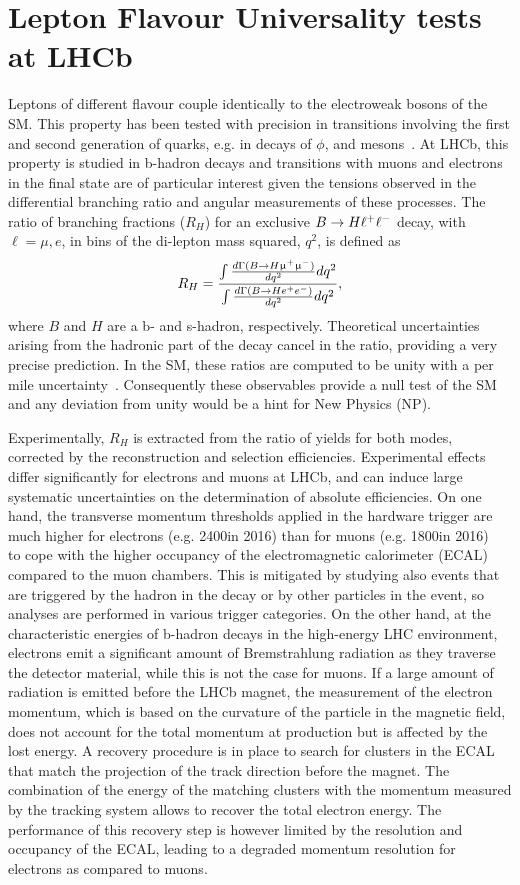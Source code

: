 \documentclass[a4paper,11pt]{article}
\begin{document}
\section{Lepton Flavour Universality tests at LHCb}
Leptons of different flavour couple identically to the electroweak bosons of the SM. 
This property has been tested with precision in transitions involving the first and second generation of quarks, e.g. in decays of $\phi$, \jpsi and \psitwos mesons~\cite{PDG}.
At LHCb, this property is studied in b-hadron decays and \bsll transitions with muons and electrons in the final state are of particular interest given the tensions observed in the differential branching ratio and angular measurements of these processes.
The ratio of branching fractions ($R_H$) for an exclusive $B \to H {\ell^+}{\ell^-}$ decay, with $\ell=\mu, e$, in bins of the di-lepton mass squared, $q^2$, is defined as
\begin{equation}
	R_H = \frac{\int \frac{d\Gamma(B \to H {\upmu^+}{\upmu^-})}{dq^2}dq^2}{\int \frac{d\Gamma(B \to H e^+e^-)}{dq^2}dq^2},
\end{equation}
where $B$ and $H$ are a b- and s-hadron, respectively.
Theoretical uncertainties arising from the hadronic part of the decay cancel in the ratio, providing a very precise prediction.
In the SM, these ratios are computed to be unity with a per mile uncertainty~\cite{Fuentes}. 
Consequently these observables provide a null test of the SM and any deviation from unity would be a hint for New Physics (NP).

Experimentally, $R_H$ is extracted from the ratio of yields for both modes, corrected by the reconstruction and selection efficiencies.
Experimental effects differ significantly for electrons and muons at LHCb, and can induce large systematic uncertainties on the determination of absolute efficiencies. 
On one hand, the transverse momentum thresholds applied in the hardware trigger are much higher for electrons (e.g. 2400\mev in 2016) 
than for muons (e.g. 1800\mev in 2016)~\cite{trigger} to cope with the higher occupancy of the electromagnetic calorimeter (ECAL) compared to the muon chambers. 
This is mitigated by studying also events that are triggered by the hadron in the decay or by other particles in the event, so analyses are performed in various trigger categories. 
On the other hand, at the characteristic energies of b-hadron decays in the high-energy LHC environment, electrons emit a significant amount of Bremstrahlung radiation as they traverse the detector material, while this is not the case for muons. 
If a large amount of radiation is emitted before the LHCb magnet, the measurement of the electron momentum, which is based on the curvature of the particle in the magnetic field, does not account for the total momentum at production but is affected by the lost energy. 
A recovery procedure is in place to search for clusters in the ECAL that match the projection of the track direction before the magnet. The combination of the energy of the matching clusters with the momentum measured by the tracking system allows to recover the total electron energy. 
The performance of this recovery step is however limited by the resolution and occupancy of the ECAL, leading to a degraded momentum resolution for electrons as compared to muons. 
\end{document}
